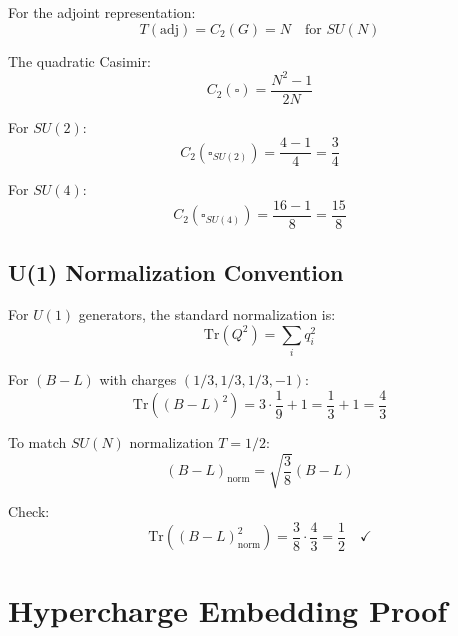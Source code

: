 \documentclass[11pt,a4paper]{article}
\begin{document}
For the adjoint representation:
\begin{equation}
\label{eq:adj-index}
T(\text{adj}) = C_2(G) = N \quad \text{for } SU(N)
\end{equation}

The quadratic Casimir:
\begin{equation}
\label{eq:casimir-fund}
C_2(\square) = \frac{N^2 - 1}{2N}
\end{equation}

For $SU(2)$:
\begin{equation}
\label{eq:casimir-su2}
C_2(\square_{SU(2)}) = \frac{4 - 1}{4} = \frac{3}{4}
\end{equation}

For $SU(4)$:
\begin{equation}
\label{eq:casimir-su4}
C_2(\square_{SU(4)}) = \frac{16 - 1}{8} = \frac{15}{8}
\end{equation}

\subsection{U(1) Normalization Convention}
\label{app:u1-norm}

For $U(1)$ generators, the standard normalization is:
\begin{equation}
\label{eq:u1-norm-std}
\mathrm{Tr}(Q^2) = \sum_i q_i^2
\end{equation}

For $(B-L)$ with charges $(1/3, 1/3, 1/3, -1)$:
\begin{equation}
\label{eq:bl-trace-explicit}
\mathrm{Tr}((B-L)^2) = 3 \cdot \frac{1}{9} + 1 = \frac{1}{3} + 1 = \frac{4}{3}
\end{equation}

To match $SU(N)$ normalization $T = 1/2$:
\begin{equation}
\label{eq:bl-rescale-factor}
(B-L)_{\text{norm}} = \sqrt{\frac{3}{8}} (B-L)
\end{equation}

Check:
\begin{equation}
\label{eq:bl-rescale-check}
\mathrm{Tr}((B-L)_{\text{norm}}^2) = \frac{3}{8} \cdot \frac{4}{3} = \frac{1}{2} \quad \checkmark
\end{equation}

\section{Hypercharge Embedding Proof}
\label{app:hypercharge-proof}
\end{document}
